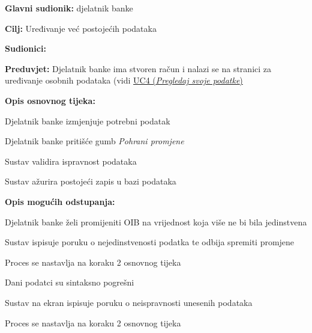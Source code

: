				
					\noindent {}
					\begin{packed_item}
	
						\item \textbf{Glavni sudionik: }djelatnik banke
						\item  \textbf{Cilj:} Uređivanje već postojećih podataka 
						\item  \textbf{Sudionici:} 
						\item  \textbf{Preduvjet: }Djelatnik banke ima stvoren račun i nalazi se na stranici za uređivanje osobnih podataka (vidi \hyperref[UC4]{UC4 (\textit{Pregledaj svoje podatke})}
						\item  \textbf{Opis osnovnog tijeka:}
						
						\item[] \begin{packed_enum}
	                        \item Djelatnik banke izmjenjuje potrebni podatak 
	                        \item Djelatnik banke pritišće gumb \textit{Pohrani promjene}
	                        \item Sustav validira ispravnost podataka
	                        \item Sustav ažurira postojeći zapis u bazi podataka
	                        
						\end{packed_enum}
						
						\item  \textbf{Opis mogućih odstupanja:}
						
						\item[] \begin{packed_item}
	
							\item[4.a] Djelatnik banke želi promijeniti OIB na vrijednost koja više ne bi bila jedinstvena
							\begin{packed_enum}
								\item Sustav ispisuje poruku o nejedinstvenosti podatka te odbija spremiti promjene
								\item Proces se nastavlja na koraku 2 osnovnog tijeka
							\end{packed_enum}
							
							\item[4.b] Dani podatci su sintaksno pogrešni
							\begin{packed_enum}
								\item Sustav na ekran ispisuje poruku o neispravnosti unesenih podataka
								\item Proces se nastavlja na koraku 2 osnovnog tijeka
							\end{packed_enum}
							
						\end{packed_item}
						
					\end{packed_item}
					
